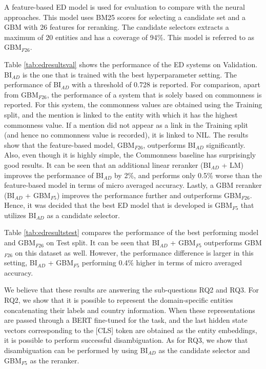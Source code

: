 \documentclass{report}
\theoremstyle{definition}
\theoremstyle{remark}
\begin{document}
A feature-based ED model is used for evaluation to compare with the neural approaches. This model uses BM25 \cite{bm25} scores for selecting a candidate set and a GBM with 26 features for reranking. The candidate selectors extracts a maximum of 20 entities and has a coverage of 94\%. This model is referred to as GBM$_{F26}$.

Table \ref{tab:edresultsval} shows the performance of the ED systems on Validation. BI$_{AD}$ is the one that is trained with the best hyperparameter setting. The performance of BI$_{AD}$ with a threshold of 0.728 is reported. For comparison, apart from GBM$_{F26}$, the performance of a system that is solely based on commonness is reported. For this system, the commonness values are obtained using the Training split, and the mention is linked to the entity with which it has the highest commonness value. If a mention did not appear as a link in the Training split (and hence no commonness value is recorded), it is linked to NIL. The results show that the feature-based model, GBM$_{F26}$, outperforms BI$_{AD}$ significantly. Also, even though it is highly simple, the Commonness baseline has surprisingly good results. It can be seen that an additional linear reranker (BI$_{AD}$ + LM) improves the performance of BI$_{AD}$ by 2\%, and performs only 0.5\% worse than the feature-based model in terms of micro averaged accuracy. Lastly, a GBM reranker (BI$_{AD}$ + GBM$_{F5}$) improves the performance further and outperforms GBM$_{F26}$. Hence, it was decided that the best ED model that is developed is GBM$_{F5}$ that utilizes BI$_{AD}$ as a candidate selector.

Table \ref{tab:edresultstest} compares the performance of the best performing model and GBM$_{F26}$ on Test split. It can be seen that BI$_{AD}$ + GBM$_{F5}$ outperforms GBM$_{F26}$  on this dataset as well. However, the performance difference is larger in this setting, BI$_{AD}$ + GBM$_{F5}$ performing 0.4\% higher in terms of micro averaged accuracy.

We believe that these results are answering the sub-questions RQ2 and RQ3. For RQ2, we show that it is possible to represent the domain-specific entities concatenating their labels and country information. When these representations are passed through a BERT fine-tuned for the task, and the last hidden state vectors corresponding to the [CLS] token are obtained as the entity embeddings, it is possible to perform successful disambiguation. As for RQ3, we show that disambiguation can be performed by using BI$_{AD}$ as the candidate selector and GBM$_{F5}$ as the reranker.
\end{document}
